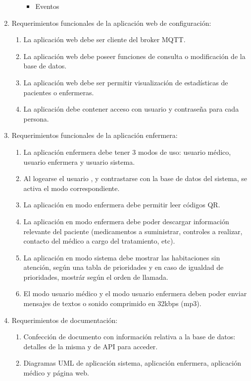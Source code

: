 \documentclass[
11pt, %
]{charter}
\begin{document}
\begin{enumerate}
\begin{enumerate}
\begin{itemize}
				\item Eventos 
			\end{itemize}
		\end{enumerate}	
	\item Requerimientos funcionales de la aplicación web de configuración:
		\begin{enumerate}	
		\item La aplicación web debe ser cliente del broker MQTT.
		\item La aplicación web debe poseer funciones de consulta o modificación de la base de datos.
		\item La aplicación web debe ser permitir visualización de estadísticas de pacientes o enfermeras.
		\item La aplicación debe contener acceso con usuario y contraseña para cada persona.
		\end{enumerate}			
	\item Requerimientos funcionales de la aplicación enfermera:
		\begin{enumerate}
			\item La aplicación enfermera debe tener 3 modos de uso: usuario médico, usuario enfermera y usuario sistema.
			\item Al logearse el usuario , y contrastarse con la base de datos del sistema, se activa el modo correspondiente.
			\item La aplicación en modo enfermera debe permitir leer códigos QR.			
			\item La aplicación en modo enfermera debe poder descargar información relevante del paciente (medicamentos a suministrar, controles a realizar, contacto del médico a cargo del tratamiento, etc).	
			\item La aplicación en modo sistema debe mostrar las habitaciones sin atención, según una tabla de prioridades y en caso de igualdad de prioridades, mostrár según el orden de llamada.
			\item El modo usuario médico y el modo usuario enfermera deben poder enviar mensajes de textos o sonido comprimido en 32kbps (mp3).
		\end{enumerate}
		
		
	\item Requerimientos de documentación:
		\begin{enumerate}
			\item Confección de documento con información relativa a la base de datos: detalles de la misma y de API para acceder.
			\item Diagramas UML de aplicación sistema, aplicación enfermera, aplicación médico y página web.
			

\end{enumerate}
\end{enumerate}
\end{document}

